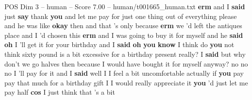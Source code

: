 \begin{textsample}{POS Dim 3 – human – Score 7.00 – human/t001665\_human.txt}  \label{ex:f3_pos_013}
\textbf{erm} and I \textbf{said} just \textbf{say} thank \textbf{you} and let me pay for just one thing out of everything please and he was like \textbf{okay} then and that 's only because \textbf{erm} we 'd left the antiques place and I 'd chosen this \textbf{erm} and I was going to buy it for myself and he \textbf{said} \textbf{oh} I 'll get it for your birthday and I \textbf{said} \textbf{oh} \textbf{you} \textbf{know} I think do \textbf{you} not think sixty pound is a bit excessive for a birthday present really?
I \textbf{said} but why don't we go halves then because I would have bought it for myself anyway? no no no I 'll pay for it and I \textbf{said} well I I feel a bit uncomfortable actually if \textbf{you} pay pay that much for a birthday gift I I would really appreciate it \textbf{you} 'd just let me pay half \textbf{cos} I just think that 's a bit

\end{textsample}
